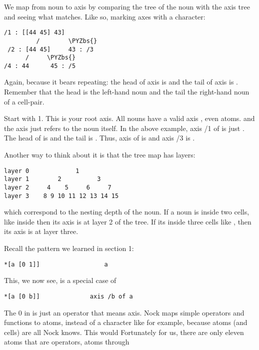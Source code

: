 We map from noun to axis by comparing the tree of the noun with the axis tree
and seeing what matches. Like so, marking axes with a \kode{/} character:
\begin{framed_shaded}
\begin{Verbatim}[fontsize=\relsize{-2.5},fontseries=b,commandchars=\\\{\}]
  /1 : [[44 45] 43]
         /        \PYZbs{}
 /2 : [44 45]     43 : /3
      /     \PYZbs{}
/4 : 44      45 : /5
\end{Verbatim}
\end{framed_shaded}
Again, because it bears repeating: the head of axis  is  and the tail
of axis  is . Remember that the head is the left-hand noun and the
tail the right-hand noun of a cell-pair.

Start with 1. This is your root axis. All nouns have a valid axis , even
atoms. and the axis  just refers to the noun itself. In the above example,
axis /1 of \kode{[[44 45] 43]} is just \kode{[[44 45] 43]}. The head of \kode{[[44 45] 43]} is
\kode{[44 45]} and the tail is . Thus, axis  of \kode{[[44 45] 43]} is \kode{[44 45]}
and axis /3 is .

Another way to think about it is that the tree map has layers:
\begin{framed_shaded}
\begin{Verbatim}[fontsize=\relsize{-2.5},fontseries=b,commandchars=\\\{\}]
layer 0             1
layer 1        2          3
layer 2     4    5     6     7
layer 3    8 9 10 11 12 13 14 15
\end{Verbatim}
\end{framed_shaded}
which correspond to the nesting depth of the noun. If a noun is inside two
cells, like  inside \kode{[[[48 49] 45] [46 47]]} then its axis is at layer 2 of
the tree. If its inside three cells like , then its axis is at layer
three.

Recall the pattern we learned in section 1:
\begin{framed_shaded}
\begin{Verbatim}[fontsize=\relsize{-2.5},fontseries=b,commandchars=\\\{\}]
*[a [0 1]]                  a
\end{Verbatim}
\end{framed_shaded}
This, we now see, is a special case of 
\begin{framed_shaded}
\begin{Verbatim}[fontsize=\relsize{-2.5},fontseries=b,commandchars=\\\{\}]
*[a [0 b]]              axis /b of a
\end{Verbatim}
\end{framed_shaded}
The 0 in \kode{*[a [0 b]]} is just an operator that means axis. Nock maps simple
operators and functions to atoms, instead of a character like \kode{/} for example,
because atoms (and cells) are all Nock knows. This would Fortunately for us,
there are only eleven atoms that are operators, atoms  through 

